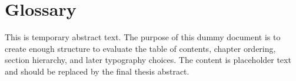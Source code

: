 \chapter*{Glossary}

This is temporary abstract text. The purpose of this dummy document is to create enough structure to evaluate the table of contents, chapter ordering, section hierarchy, and later typography choices. The content is placeholder text and should be replaced by the final thesis abstract.
